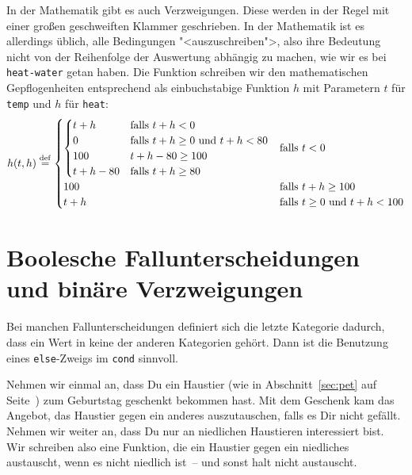 In der Mathematik gibt es auch Verzweigungen.  Diese werden in der
Regel mit einer großen geschweiften Klammer geschrieben.  In der
Mathematik ist es allerdings üblich, alle Bedingungen
"<auszuschreiben">, also ihre Bedeutung nicht von der Reihenfolge der
Auswertung abhängig zu machen, wie wir es bei \texttt{heat-water}
getan haben.  Die Funktion schreiben wir den mathematischen
Gepflogenheiten entsprechend als einbuchstabige Funktion $h$ mit
Parametern $t$ für \texttt{temp} und $h$ für \texttt{heat}:
%
\begin{displaymath}
  h(t, h) \stackrel{\rm def}{=}
  \begin{cases}
    \begin{cases}
      t + h & \text{falls } t + h < 0\\
      0 & \text{falls } t + h \geq 0 \text{ und } t + h < 80 \\
      100 & t + h - 80 \geq 100\\
      t + h - 80 & \text{falls }  t +h \geq
      80
    \end{cases}
    & \text{falls } t < 0
    \\
    100 & \text{falls } t + h \geq 100
    \\
    t + h & \text{falls } t \geq 0 \text{ und } t + h < 100
  \end{cases}
\end{displaymath}

\section{Boolesche Fallunterscheidungen und binäre Verzweigungen}
\label{sec:binaere-verzweigungen}

Bei manchen Fallunterscheidungen definiert sich die letzte Kategorie
dadurch, dass ein Wert in keine der anderen Kategorien gehört.  Dann
ist die Benutzung eines \texttt{else}-Zweigs im \texttt{cond}
sinnvoll.

Nehmen wir einmal an, dass Du ein Haustier (wie in
Abschnitt~\ref{sec:pet} auf Seite~\pageref{sec:pet}) zum Geburtstag
geschenkt bekommen hast. Mit dem Geschenk kam das Angebot, das
Haustier gegen ein anderes auszutauschen, falls es Dir nicht gefällt.
Nehmen wir weiter an, dass Du nur an niedlichen Haustieren
interessiert bist.  Wir schreiben also eine Funktion, die ein Haustier
gegen ein niedliches austauscht, wenn es nicht niedlich ist~-- und
sonst halt nicht austauscht.

